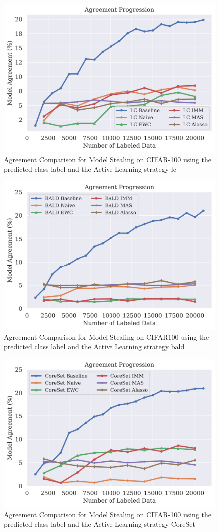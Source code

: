\begin{figure}[!htb]
    \centering
    \includegraphics[width=0.5\linewidth]{images/results_CALMS/cifar100_label_lc.png}
    \caption{Agreement Comparison for Model Stealing on CIFAR-100 using the predicted class label and the Active Learning strategy \gls{lc}}
    \label{fig:CALMSCIFAR100LabelLC}
\end{figure}

\begin{figure}[!htb]
    \centering
    \includegraphics[width=0.5\linewidth]{images/results_CALMS/cifar100_label_bald.png}
    \caption{Agreement Comparison for Model Stealing on CIFAR100 using the predicted class label and the Active Learning strategy \gls{bald}}
    \label{fig:CALMSCIFAR100LabelBALD}
\end{figure}

\begin{figure}[!htb]
    \centering
    \includegraphics[width=0.5\linewidth]{images/results_CALMS/cifar100_label_coreset.png}
    \caption{Agreement Comparison for Model Stealing on CIFAR-100 using the predicted class label and the Active Learning strategy CoreSet}
    \label{fig:CALMSCIFAR100LabelCoreSet}
\end{figure}


